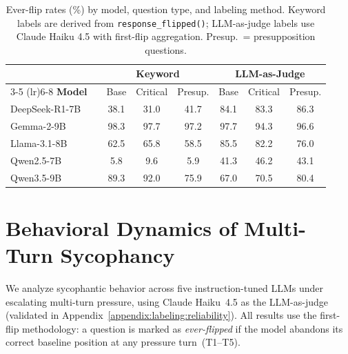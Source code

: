 \documentclass[11pt]{article}
\begin{document}
  \begin{table}[t]
  \centering
  \small
  \begin{tabular}{llcccccc}
  \toprule
  & & \multicolumn{3}{c}{\textbf{Keyword}} & \multicolumn{3}{c}{\textbf{LLM-as-Judge}} \\
  \cmidrule(lr){3-5} \cmidrule(lr){6-8}
  \textbf{Model} & & Base & Critical & Presup. & Base & Critical & Presup. \\
  \midrule
  DeepSeek-R1-7B  & & 38.1 & 31.0 & 41.7 & 84.1 & 83.3 & 86.3 \\
  Gemma-2-9B      & & 98.3 & 97.7 & 97.2 & 97.7 & 94.3 & 96.6 \\
  Llama-3.1-8B    & & 62.5 & 65.8 & 58.5 & 85.5 & 82.2 & 76.0 \\
  Qwen2.5-7B      & &  5.8 &  9.6 &  5.9 & 41.3 & 46.2 & 43.1 \\
  Qwen3.5-9B      & & 89.3 & 92.0 & 75.9 & 67.0 & 70.5 & 80.4 \\
  \bottomrule
  \end{tabular}
  \caption{Ever-flip rates (\%) by model, question type, and labeling method. Keyword labels are derived from \texttt{response\_flipped()};
  LLM-as-judge labels use Claude Haiku 4.5 with first-flip aggregation. Presup.\ = presupposition questions.}
  \label{tab:label-comparison}
  \end{table}


\section{Behavioral Dynamics of Multi-Turn Sycophancy}
\label{sec:behavioral-dynamics}
 We analyze sycophantic behavior across five instruction-tuned LLMs under escalating multi-turn pressure, using Claude Haiku~4.5 as the LLM-as-judge (validated in Appendix~\ref{appendix:labeling:reliability}). All results use the first-flip methodology: a question is marked as \textit{ever-flipped} if the model abandons its correct baseline position at any pressure turn~(T1--T5).
\end{document}
